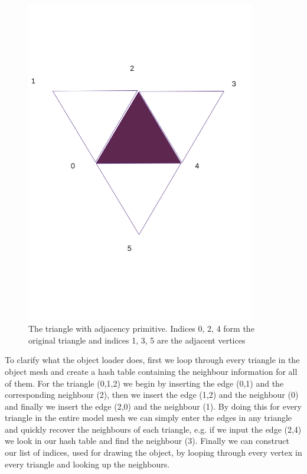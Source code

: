 \documentclass[a4paper, 12pt]{article}
\begin{document}
\begin{figure}[h]
\centering
\includegraphics[width=10cm, trim = 0mm 50mm 0mm 50mm, clip]{triangle_adj.png}
\caption{The triangle with adjacency primitive. Indices 0, 2, 4 form the
original triangle and indices 1, 3, 5 are the adjacent vertices}
\end{figure}

To clarify what the object loader does, first we loop through every triangle in
the object mesh and create a hash table containing the neighbour information for
all of them. For the triangle (0,1,2) we begin by inserting the edge (0,1) and
the corresponding neighbour (2), then we insert the edge (1,2) and the
neighbour (0) and finally we insert the edge (2,0) and the neighbour (1). By
doing this for every triangle in the entire model mesh we can simply enter the
edges in any triangle and quickly recover the neighbours of each triangle, e.g.
if we input the edge (2,4) we look in our hash table and find the neighbour
(3). Finally we can construct our list of indices, used for drawing the object,
by looping through every vertex in every triangle and looking up the neighbours.
\end{document}

